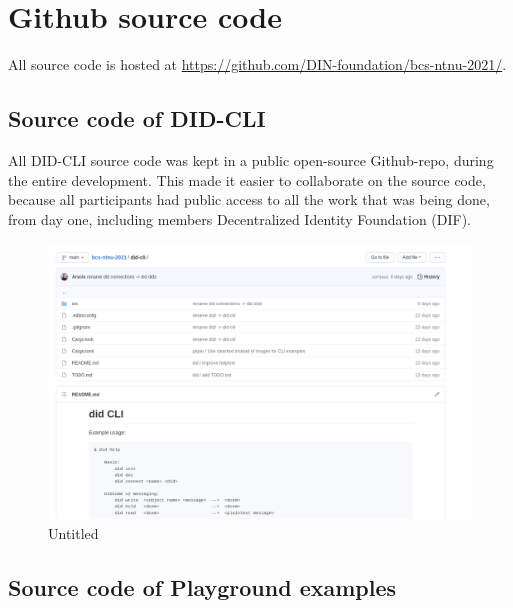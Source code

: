 \hypertarget{github-source-code}{%
\section{Github source code}\label{github-source-code}}

All source code is hosted at
\url{https://github.com/DIN-foundation/bcs-ntnu-2021/}.

\hypertarget{source-code-of-did-cli}{%
\subsection{Source code of DID-CLI}\label{source-code-of-did-cli}}

All DID-CLI source code was kept in a public open-source Github-repo,
during the entire development. This made it easier to collaborate on the
source code, because all participants had public access to all the work
that was being done, from day one, including members Decentralized Identity Foundation (DIF).

\begin{figure}
\centering
\includegraphics[width=\textwidth]{Development Process a132dd5987b94adf8fc5989add9afc3f/Untitled 1.png}
\caption{Untitled}
\end{figure}



\pagebreak



\hypertarget{source-code-of-playground-example}{%
\subsection{Source code of Playground
examples}\label{source-code-of-playground-example}}


